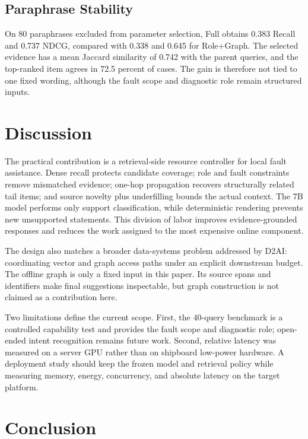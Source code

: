 \documentclass[conference]{IEEEtran}
\begin{document}
\subsection{Paraphrase Stability}

On 80 paraphrases excluded from parameter selection, Full obtains 0.383 Recall and 0.737 NDCG, compared with 0.338 and 0.645 for Role+Graph. The selected evidence has a mean Jaccard similarity of 0.742 with the parent queries, and the top-ranked item agrees in 72.5 percent of cases. The gain is therefore not tied to one fixed wording, although the fault scope and diagnostic role remain structured inputs.

\section{Discussion}

The practical contribution is a retrieval-side resource controller for local fault assistance. Dense recall protects candidate coverage; role and fault constraints remove mismatched evidence; one-hop propagation recovers structurally related tail items; and source novelty plus underfilling bounds the actual context. The 7B model performs only support classification, while deterministic rendering prevents new unsupported statements. This division of labor improves evidence-grounded responses and reduces the work assigned to the most expensive online component.

\balance
The design also matches a broader data-systems problem addressed by D2AI: coordinating vector and graph access paths under an explicit downstream budget. The offline graph is only a fixed input in this paper. Its source spans and identifiers make final suggestions inspectable, but graph construction is not claimed as a contribution here.

Two limitations define the current scope. First, the 40-query benchmark is a controlled capability test and provides the fault scope and diagnostic role; open-ended intent recognition remains future work. Second, relative latency was measured on a server GPU rather than on shipboard low-power hardware. A deployment study should keep the frozen model and retrieval policy while measuring memory, energy, concurrency, and absolute latency on the target platform.

\section{Conclusion}
\end{document}

